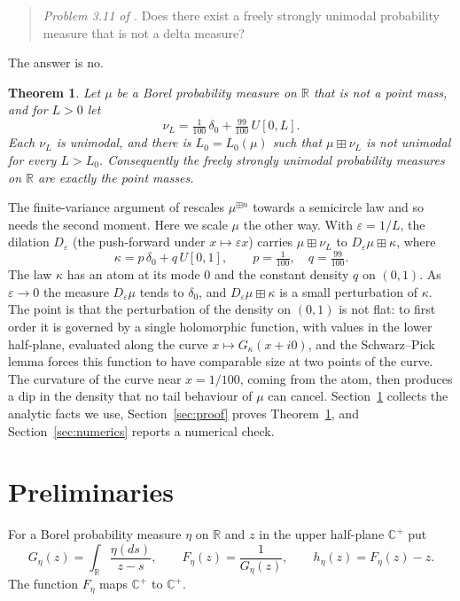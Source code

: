 \documentclass[11pt]{amsart}
\newtheorem{theorem}{Theorem}[section]
\theoremstyle{definition}
\theoremstyle{remark}
\numberwithin{equation}{section}
\newcommand{\R}{\mathbb{R}}
\newcommand{\Hp}{\mathbb{C}^+}
\newcommand{\bp}{\boxplus}
\newcommand{\eps}{\varepsilon}
\begin{document}
\begin{quote}
\emph{Problem 3.11 of \cite{HU18}.} Does there exist a freely strongly unimodal probability measure that is not a delta measure?
\end{quote}

The answer is no.

\begin{theorem}\label{thm:main}
Let $\mu$ be a Borel probability measure on $\R$ that is not a point mass, and for $L>0$ let
\[
\nu_L=\tfrac1{100}\,\delta_0+\tfrac{99}{100}\,U[0,L].
\]
Each $\nu_L$ is unimodal, and there is $L_0=L_0(\mu)$ such that $\mu\bp\nu_L$ is not unimodal for every $L>L_0$. Consequently the freely strongly unimodal probability measures on $\R$ are exactly the point masses.
\end{theorem}

The finite-variance argument of \cite{HU18} rescales $\mu^{\bp n}$ towards a semicircle law and so needs the second moment. Here we scale $\mu$ the other way. With $\eps=1/L$, the dilation $D_\eps$ (the push-forward under $x\mapsto\eps x$) carries $\mu\bp\nu_L$ to $D_\eps\mu\bp\kappa$, where
\begin{equation}\label{eq:kappa}
\kappa=p\,\delta_0+q\,U[0,1],\qquad p=\tfrac1{100},\quad q=\tfrac{99}{100}.
\end{equation}
The law $\kappa$ has an atom at its mode $0$ and the constant density $q$ on $(0,1)$. As $\eps\to0$ the measure $D_\eps\mu$ tends to $\delta_0$, and $D_\eps\mu\bp\kappa$ is a small perturbation of $\kappa$. The point is that the perturbation of the density on $(0,1)$ is not flat: to first order it is governed by a single holomorphic function, with values in the lower half-plane, evaluated along the curve $x\mapsto G_\kappa(x+i0)$, and the Schwarz--Pick lemma forces this function to have comparable size at two points of the curve. The curvature of the curve near $x=1/100$, coming from the atom, then produces a dip in the density that no tail behaviour of $\mu$ can cancel. Section~\ref{sec:prelim} collects the analytic facts we use, Section~\ref{sec:proof} proves Theorem~\ref{thm:main}, and Section~\ref{sec:numerics} reports a numerical check.

\section{Preliminaries}\label{sec:prelim}

For a Borel probability measure $\eta$ on $\R$ and $z$ in the upper half-plane $\Hp$ put
\[
G_\eta(z)=\int_\R\frac{\eta(ds)}{z-s},\qquad F_\eta(z)=\frac1{G_\eta(z)},\qquad h_\eta(z)=F_\eta(z)-z .
\]
The function $F_\eta$ maps $\Hp$ to $\Hp$.
\end{document}
